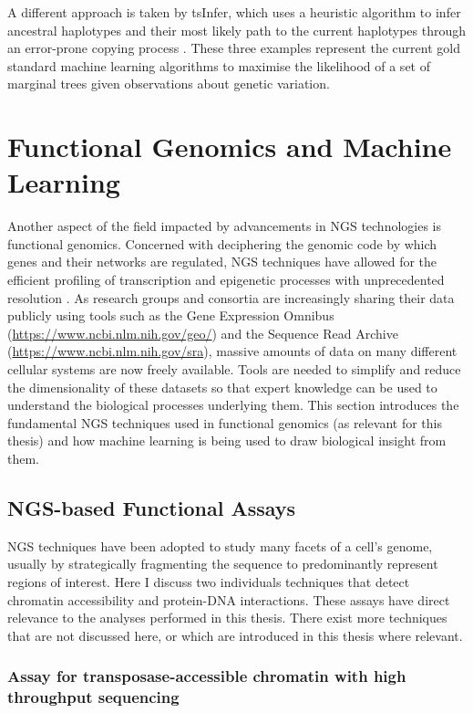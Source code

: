 A different approach is taken by tsInfer, which uses a heuristic algorithm to infer ancestral haplotypes and their most likely path to the current haplotypes through an error-prone copying process \cite{Kelleher2019a}. These three examples represent the current gold standard machine learning algorithms to maximise the likelihood of a set of marginal trees given observations about genetic variation.

\section{Functional Genomics and Machine Learning} \label{intro:fungen}

Another aspect of the field impacted by advancements in NGS technologies is functional genomics. Concerned with deciphering the genomic code by which genes and their networks are regulated, NGS techniques have allowed for the efficient profiling of transcription and epigenetic processes with unprecedented resolution \cite{Morozova2008,Cullum2011,Morozova2008a,Hurd2009,T2010}. As research groups and consortia are increasingly sharing their data publicly using tools such as the Gene Expression Omnibus (\url{https://www.ncbi.nlm.nih.gov/geo/}) and the Sequence Read Archive (\url{https://www.ncbi.nlm.nih.gov/sra}), massive amounts of data on many different cellular systems are now freely available. Tools are needed to simplify and reduce the dimensionality of these datasets so that expert knowledge can be used to understand the biological processes underlying them. This section introduces the fundamental NGS techniques used in functional genomics (as relevant for this thesis) and how machine learning is being used to draw biological insight from them.

\subsection{NGS-based Functional Assays}

NGS techniques have been adopted to study many facets of a cell's genome, usually by strategically fragmenting the sequence to predominantly represent regions of interest. Here I discuss two individuals techniques that detect chromatin accessibility and protein-DNA interactions.  These assays have direct relevance to the analyses performed in this thesis. There exist more techniques that are not discussed here, or which are introduced in this thesis where relevant. 

\subsubsection{Assay for transposase-accessible chromatin with high throughput sequencing}

